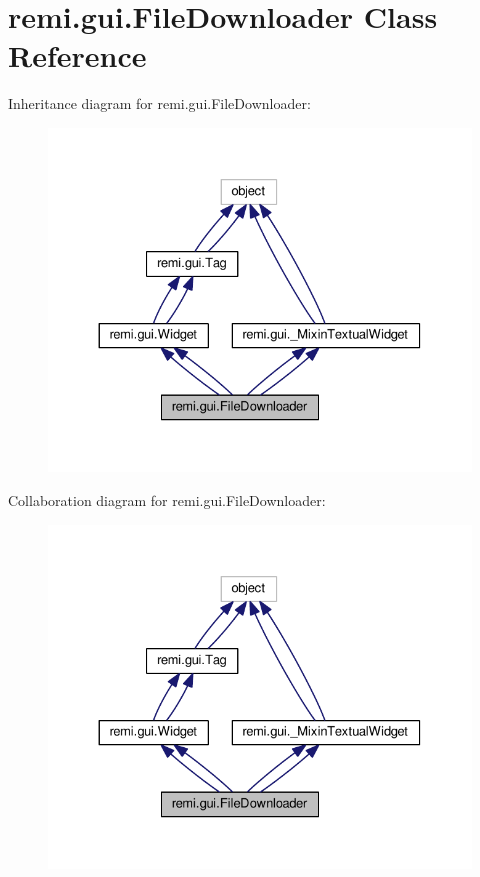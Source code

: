 \hypertarget{classremi_1_1gui_1_1FileDownloader}{}\section{remi.\+gui.\+File\+Downloader Class Reference}
\label{classremi_1_1gui_1_1FileDownloader}


Inheritance diagram for remi.\+gui.\+File\+Downloader\+:
\nopagebreak
\begin{figure}[H]
\begin{center}
\leavevmode
\includegraphics[width=330pt]{d8/dd3/classremi_1_1gui_1_1FileDownloader__inherit__graph}
\end{center}
\end{figure}


Collaboration diagram for remi.\+gui.\+File\+Downloader\+:
\nopagebreak
\begin{figure}[H]
\begin{center}
\leavevmode
\includegraphics[width=330pt]{d7/de5/classremi_1_1gui_1_1FileDownloader__coll__graph}
\end{center}
\end{figure}

